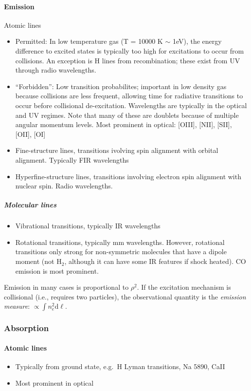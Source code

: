 \documentclass{article}
\begin{document}
\paragraph{Emission}
Atomic lines
\begin{itemize}
    \item Permitted: In low temperature gas (T = 10000 K $\sim$ 1eV),
        the energy difference to excited states is typically too high
        for excitations to occur from collisions. An exception is
        H lines from recombination; these exist from UV through radio
        wavelengths.
    \item ``Forbidden'': Low transition probabilites; important in low
        density gas because collisions are less frequent, allowing time
        for radiative transitions to occur before collisional de-excitation.
        Wavelengths are typically in the optical and UV regimes. Note that
        many of these are doublets because of multiple angular momentum
        levels. Most prominent in optical: [OIII], [NII], [SII], [OII], [OI]
    \item Fine-structure lines, transitions ivolving spin alignment with
        orbital alignment. Typically FIR wavelengths
    \item Hyperfine-structure lines, transitions involving electron spin
        alignment with nuclear spin. Radio wavelengths.
\end{itemize}
\subparagraph{Molecular lines}
\begin{itemize}
    \item Vibrational transitions, typically IR wavelengths
    \item Rotational transitions, typically mm wavelengths. However,
        rotational transitions only strong for non-symmetric molecules
        that have a dipole moment (not H$_{2}$, although it can have
        some IR features if shock heated). CO emission is most prominent.
\end{itemize}
Emission in many cases is proportional to $\rho^{2}$. If the excitation
mechanism is collisional (i.e., requires two particles), the observational
quantity is the \textit{emission measure}: $\propto\int{n_{e}^{2}\mathrm{d}\ell}$.

\subsubsection{Absorption}
\paragraph{Atomic lines}
\begin{itemize}
    \item Typically from ground state, e.g.\ H Lyman transitions,
        Na 5890, CaII
    \item Most prominent in optical
\end{itemize}
\end{document}
